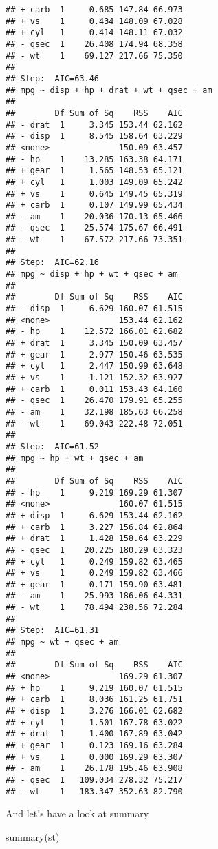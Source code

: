 \documentclass[
]{article}
\newenvironment{Shaded}{\begin{snugshade}}{\end{snugshade}}
\newcommand{\FunctionTok}[1]{\textcolor[rgb]{0.00,0.00,0.00}{#1}}
\newcommand{\NormalTok}[1]{#1}
\begin{document}
\begin{verbatim}
## + carb  1     0.685 147.84 66.973
## + vs    1     0.434 148.09 67.028
## + cyl   1     0.414 148.11 67.032
## - qsec  1    26.408 174.94 68.358
## - wt    1    69.127 217.66 75.350
## 
## Step:  AIC=63.46
## mpg ~ disp + hp + drat + wt + qsec + am
## 
##        Df Sum of Sq    RSS    AIC
## - drat  1     3.345 153.44 62.162
## - disp  1     8.545 158.64 63.229
## <none>              150.09 63.457
## - hp    1    13.285 163.38 64.171
## + gear  1     1.565 148.53 65.121
## + cyl   1     1.003 149.09 65.242
## + vs    1     0.645 149.45 65.319
## + carb  1     0.107 149.99 65.434
## - am    1    20.036 170.13 65.466
## - qsec  1    25.574 175.67 66.491
## - wt    1    67.572 217.66 73.351
## 
## Step:  AIC=62.16
## mpg ~ disp + hp + wt + qsec + am
## 
##        Df Sum of Sq    RSS    AIC
## - disp  1     6.629 160.07 61.515
## <none>              153.44 62.162
## - hp    1    12.572 166.01 62.682
## + drat  1     3.345 150.09 63.457
## + gear  1     2.977 150.46 63.535
## + cyl   1     2.447 150.99 63.648
## + vs    1     1.121 152.32 63.927
## + carb  1     0.011 153.43 64.160
## - qsec  1    26.470 179.91 65.255
## - am    1    32.198 185.63 66.258
## - wt    1    69.043 222.48 72.051
## 
## Step:  AIC=61.52
## mpg ~ hp + wt + qsec + am
## 
##        Df Sum of Sq    RSS    AIC
## - hp    1     9.219 169.29 61.307
## <none>              160.07 61.515
## + disp  1     6.629 153.44 62.162
## + carb  1     3.227 156.84 62.864
## + drat  1     1.428 158.64 63.229
## - qsec  1    20.225 180.29 63.323
## + cyl   1     0.249 159.82 63.465
## + vs    1     0.249 159.82 63.466
## + gear  1     0.171 159.90 63.481
## - am    1    25.993 186.06 64.331
## - wt    1    78.494 238.56 72.284
## 
## Step:  AIC=61.31
## mpg ~ wt + qsec + am
## 
##        Df Sum of Sq    RSS    AIC
## <none>              169.29 61.307
## + hp    1     9.219 160.07 61.515
## + carb  1     8.036 161.25 61.751
## + disp  1     3.276 166.01 62.682
## + cyl   1     1.501 167.78 63.022
## + drat  1     1.400 167.89 63.042
## + gear  1     0.123 169.16 63.284
## + vs    1     0.000 169.29 63.307
## - am    1    26.178 195.46 63.908
## - qsec  1   109.034 278.32 75.217
## - wt    1   183.347 352.63 82.790
\end{verbatim}

And let's have a look at summary

\begin{Shaded}
\begin{Highlighting}[]
\FunctionTok{summary}\NormalTok{(st)}
\end{Highlighting}
\end{Shaded}
\end{document}
